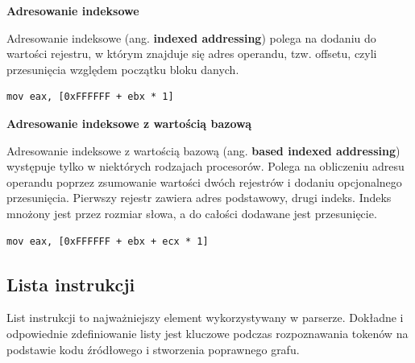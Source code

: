\documentclass[a4paper,12pt]{article}
\begin{document}
\textbf{Adresowanie indeksowe}

Adresowanie indeksowe (ang. \textbf{indexed addressing}) polega na dodaniu do wartości rejestru, w którym znajduje się adres operandu, tzw. offsetu, czyli przesunięcia względem początku bloku danych.

\begin{lstlisting}
mov eax, [0xFFFFFF + ebx * 1]
\end{lstlisting}

\textbf{Adresowanie indeksowe z wartością bazową}

Adresowanie indeksowe z wartością bazową (ang. \textbf{based indexed addressing}) występuje tylko w niektórych rodzajach procesorów. Polega na obliczeniu adresu operandu poprzez zsumowanie wartości dwóch rejestrów i dodaniu opcjonalnego przesunięcia. Pierwszy rejestr zawiera adres podstawowy, drugi indeks. Indeks mnożony jest przez rozmiar słowa, a do całości dodawane jest przesunięcie.

\begin{lstlisting}
mov eax, [0xFFFFFF + ebx + ecx * 1]
\end{lstlisting}

\subsection{Lista instrukcji}

List instrukcji to najważniejszy element wykorzystywany w parserze. Dokładne i odpowiednie zdefiniowanie listy jest kluczowe podczas rozpoznawania tokenów na podstawie kodu źródłowego i stworzenia poprawnego grafu.
\end{document}
